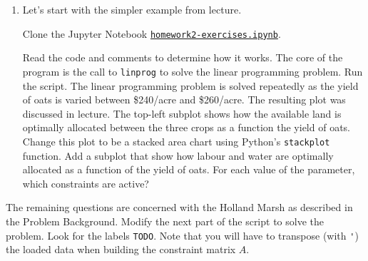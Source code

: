 \documentclass[letter]{article}
\begin{document}
\begin{enumerate}[label=\textbf{\arabic*.}]
	\item Let's start with the simpler example from lecture. 

	Clone the Jupyter Notebook \href{https://utoronto.syzygy.ca/jupyter/user-redirect/git-pull?repo=https://github.com/bigfatbernie/IBLMathModeling&subPath=homeworks/homework2/homework2-exercises.ipynb}{\tt homework2-exercises.ipynb}.
	
	Read the code and comments to determine how it works. The core of the program is the call to \verb|linprog| to solve the linear programming problem. Run the script. The linear programming problem is solved repeatedly as the yield of oats is varied between \$240/acre and \$260/acre. The resulting plot was discussed in lecture. The top-left subplot shows how the available land is optimally allocated between the three crops as a function the yield of oats. Change this plot to be a stacked area chart using Python's \verb|stackplot| function. Add a subplot that show how labour and water are optimally allocated as a function of the yield of oats. For each value of the parameter, which constraints are active? 
\end{enumerate}

The remaining questions are concerned with the Holland Marsh as described in the Problem Background. 
	Modify the next part of the script to solve the problem. Look for the labels \verb|TODO|. 
	Note that you will have to transpose (with \verb|'|) the loaded data when building the constraint matrix $A$.
\end{document}

